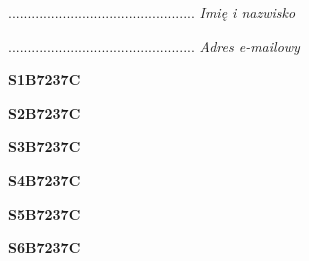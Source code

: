 \begin{turn}{90}\begin{minipage}{\linewidth} \vspace{20mm} ................................................  \textit{Imię i nazwisko}\end{minipage}\end{turn}

\begin{turn}{90}\begin{minipage}{\linewidth} \vspace{20mm} ................................................  \textit{Adres e-mailowy}\end{minipage}\end{turn}

\begin{turn}{90}\huge \begin{minipage}{\linewidth} \vspace{10mm}\textbf{S1B7237C}\end{minipage}\end{turn}

\begin{turn}{90}\huge \begin{minipage}{\linewidth} \vspace{10mm}\textbf{S2B7237C}\end{minipage}\end{turn}

\begin{turn}{90}\huge \begin{minipage}{\linewidth} \vspace{10mm}\textbf{S3B7237C}\end{minipage}\end{turn}

\begin{turn}{90}\huge \begin{minipage}{\linewidth} \vspace{10mm}\textbf{S4B7237C}\end{minipage}\end{turn}

\begin{turn}{90}\huge \begin{minipage}{\linewidth} \vspace{10mm}\textbf{S5B7237C}\end{minipage}\end{turn}

\begin{turn}{90}\huge \begin{minipage}{\linewidth} \vspace{10mm}\textbf{S6B7237C}\end{minipage}\end{turn}

